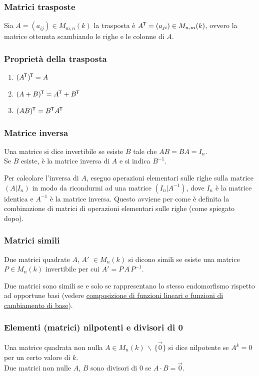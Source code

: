 \documentclass[a4paper]{article}
\newcommand\tran{^{\mkern-1.5mu\mathsf{T}}} %
\begin{document}
\subsubsection*{Matrici trasposte}
Sia \(A = (a_{ij}) \in M_{m,n}(k)\) la trasposta è \(A\tran = (a_{ji}) \in M_{n,m}(k)\), ovvero la matrice ottenuta scambiando le
righe e le colonne di \(A\).

\subsubsection*{Proprietà della trasposta}
\begin{enumerate}
	\item \((A\tran)\tran = A\)
	\item \((A+B)\tran = A\tran + B\tran\)
	\item \((AB)\tran = B\tran A\tran\)
\end{enumerate}

\subsubsection*{Matrice inversa}
Una matrice si dice invertibile se esiste \(B\) tale che \(AB = BA = I_n\). \\
Se \(B\) esiste, è la matrice inversa di \(A\) e si indica \(B^{-1}\).

Per calcolare l'inversa di \(A\), eseguo operazioni elementari sulle righe sulla matrice \((A|I_n)\) in modo da ricondurmi ad una
matrice \((I_n|A^{-1})\), dove \(I_n\) è la matrice identica e \(A^{-1}\) è la matrice inversa. Questo avviene per come è definita
la combinazione di matrici di operazioni elementari sulle righe (come spiegato dopo).

\subsubsection*{Matrici simili}
Due matrici quadrate \(A\), \(A'\) \(\in M_n(k)\) si dicono simili se esiste una matrice \(P \in M_n(k)\) invertibile per cui
\(A' = P \, A \, P^{-1}\).

Due matrici sono simili se e solo se rappresentano lo stesso endomorfismo rispetto ad opportune basi (vedere
\hyperlink{composizioneFunzioniCambiamentiDiBase}{composizione di funzioni lineari e funzioni di cambiamento di base}).

\subsubsection*{Elementi (matrici) nilpotenti e divisori di 0}
Una matrice quadrata non nulla \(A \in M_n(k) \, \backslash \, \{ \vec{0} \}\) si dice nilpotente se \(A^k = 0\) per un certo valore di \(k\). \\
Due matrici non nulle \(A\), \(B\) sono divisori di \(0\) se \(A \cdot B = \vec{0}\).
\end{document}
